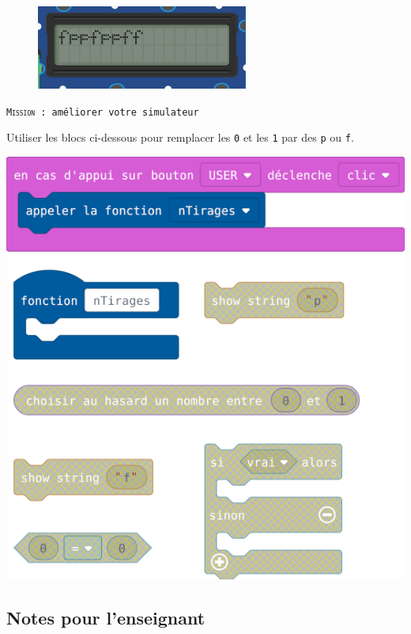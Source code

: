 %
%
\begin{figure}
    \includegraphics[width=\linewidth]{res/st-pf-01.png}
\end{figure}
\begin{eleve}
    \texttt{\textsc{Mission} : améliorer votre simulateur}
    
    Utiliser les blocs ci-dessous pour remplacer les \texttt{0} et les \texttt{1} par des \texttt{p} ou \texttt{f}.
   
    \centerline{\includegraphics[width=0.65\linewidth]{res/st-pf-01-eleve.png}}
\end{eleve}

\newpage

\subsection{Notes pour l'enseignant}

